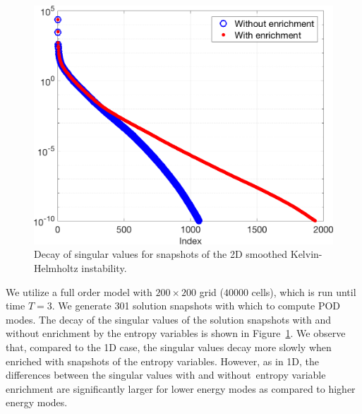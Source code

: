 \documentclass[preprint,10pt]{elsarticle}
\theoremstyle{definition}
\theoremstyle{lemma}
\theoremstyle{theorem}
\theoremstyle{assumption}
\begin{document}
\begin{figure}
\centering
\includegraphics[width=.4\textwidth]{figs/khsvd.png}
\caption{Decay of singular values for snapshots of the 2D smoothed Kelvin-Helmholtz instability.}
\label{fig:khsvd}
\end{figure}
We utilize a full order model with $200\times 200$ grid ($40000$ cells), which is run until time $T = 3$.  We generate 301 solution snapshots with which to compute POD modes.  The decay of the singular values of the solution snapshots with and without enrichment by the entropy variables is shown in Figure~\ref{fig:khsvd}.  We observe that, compared to the 1D case, the singular values decay more slowly when enriched with snapshots of the entropy variables.  However, as in 1D, the differences between the singular values with and without entropy variable enrichment are significantly larger for lower energy modes as compared to higher energy modes.  
\end{document}

